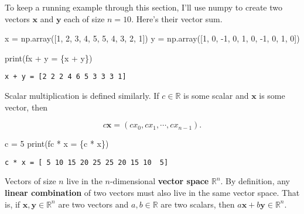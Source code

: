 \documentclass[
  letterpaper,
  DIV=11,
  numbers=noendperiod]{scrreprt}
\newenvironment{Shaded}{\begin{snugshade}}{\end{snugshade}}
\newcommand{\BuiltInTok}[1]{\textcolor[rgb]{0.00,0.23,0.31}{#1}}
\newcommand{\DecValTok}[1]{\textcolor[rgb]{0.68,0.00,0.00}{#1}}
\newcommand{\NormalTok}[1]{\textcolor[rgb]{0.00,0.23,0.31}{#1}}
\newcommand{\OperatorTok}[1]{\textcolor[rgb]{0.37,0.37,0.37}{#1}}
\newcommand{\SpecialCharTok}[1]{\textcolor[rgb]{0.37,0.37,0.37}{#1}}
\newcommand{\SpecialStringTok}[1]{\textcolor[rgb]{0.13,0.47,0.30}{#1}}
\begin{document}
To keep a running example through this section, I'll use numpy to create
two vectors \(\mathbf{x}\) and \(\mathbf{y}\) each of size \(n=10\).
Here's their vector sum.

\begin{Shaded}
\begin{Highlighting}[]
\NormalTok{x }\OperatorTok{=}\NormalTok{ np.array([}\DecValTok{1}\NormalTok{, }\DecValTok{2}\NormalTok{, }\DecValTok{3}\NormalTok{, }\DecValTok{4}\NormalTok{, }\DecValTok{5}\NormalTok{, }\DecValTok{5}\NormalTok{, }\DecValTok{4}\NormalTok{, }\DecValTok{3}\NormalTok{, }\DecValTok{2}\NormalTok{, }\DecValTok{1}\NormalTok{])}
\NormalTok{y }\OperatorTok{=}\NormalTok{ np.array([}\DecValTok{1}\NormalTok{, }\DecValTok{0}\NormalTok{, }\OperatorTok{{-}}\DecValTok{1}\NormalTok{, }\DecValTok{0}\NormalTok{, }\DecValTok{1}\NormalTok{, }\DecValTok{0}\NormalTok{, }\OperatorTok{{-}}\DecValTok{1}\NormalTok{, }\DecValTok{0}\NormalTok{, }\DecValTok{1}\NormalTok{, }\DecValTok{0}\NormalTok{])}

\BuiltInTok{print}\NormalTok{(}\SpecialStringTok{f\textquotesingle{}x + y = }\SpecialCharTok{\{}\NormalTok{x }\OperatorTok{+}\NormalTok{ y}\SpecialCharTok{\}}\SpecialStringTok{\textquotesingle{}}\NormalTok{)}
\end{Highlighting}
\end{Shaded}

\begin{verbatim}
x + y = [2 2 2 4 6 5 3 3 3 1]
\end{verbatim}

Scalar multiplication is defined similarly. If \(c \in \mathbb{R}\) is
some scalar and \(\mathbf{x}\) is some vector, then

\[c\mathbf{x} = (cx_0,cx_1,\cdots,cx_{n-1}).\]

\begin{Shaded}
\begin{Highlighting}[]
\NormalTok{c }\OperatorTok{=} \DecValTok{5}
\BuiltInTok{print}\NormalTok{(}\SpecialStringTok{f\textquotesingle{}c * x = }\SpecialCharTok{\{}\NormalTok{c }\OperatorTok{*}\NormalTok{ x}\SpecialCharTok{\}}\SpecialStringTok{\textquotesingle{}}\NormalTok{)}
\end{Highlighting}
\end{Shaded}

\begin{verbatim}
c * x = [ 5 10 15 20 25 25 20 15 10  5]
\end{verbatim}

Vectors of size \(n\) live in the \(n\)-dimensional \textbf{vector
space} \(\mathbb{R}^n\). By definition, any \textbf{linear combination}
of two vectors must also live in the same vector space. That is, if
\(\mathbf{x}, \mathbf{y} \in \mathbb{R}^n\) are two vectors and
\(a,b \in \mathbb{R}\) are two scalars, then
\(a \mathbf{x} + b \mathbf{y} \in \mathbb{R}^n\).
\end{document}
